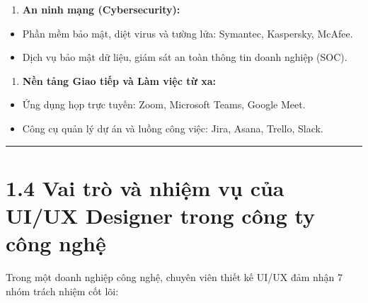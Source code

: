 \documentclass[11pt,a4paper,oneside]{report}
\begin{document}
\begin{enumerate}[leftmargin=1.5em]
\item \textbf{An ninh mạng (Cybersecurity):}
\end{enumerate}
\begin{itemize}[leftmargin=1.5em]
\item Phần mềm bảo mật, diệt virus và tường lửa: Symantec, Kaspersky, McAfee.
\item Dịch vụ bảo mật dữ liệu, giám sát an toàn thông tin doanh nghiệp (SOC).
\end{itemize}
\begin{enumerate}[leftmargin=1.5em]
\item \textbf{Nền tảng Giao tiếp và Làm việc từ xa:}
\end{enumerate}
\begin{itemize}[leftmargin=1.5em]
\item Ứng dụng họp trực tuyến: Zoom, Microsoft Teams, Google Meet.
\item Công cụ quản lý dự án và luồng công việc: Jira, Asana, Trello, Slack.
\end{itemize}

\bigskip\hrule\bigskip

\section{1.4 Vai trò và nhiệm vụ của UI/UX Designer trong công ty công nghệ}

Trong một doanh nghiệp công nghệ, chuyên viên thiết kế UI/UX đảm nhận 7 nhóm trách nhiệm cốt lõi:
\end{document}
